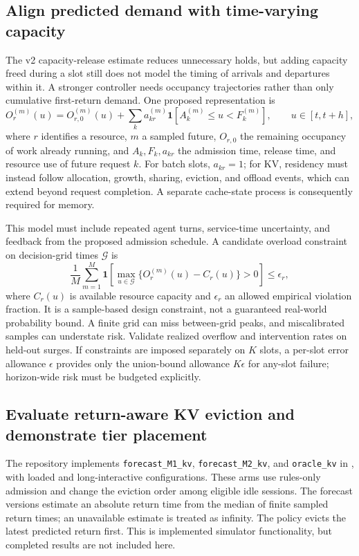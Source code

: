 \documentclass[11pt,a4paper]{article}
\begin{document}
\subsection{Align predicted demand with time-varying capacity}
The v2 capacity-release estimate reduces unnecessary holds, but adding capacity freed during a slot still does not model the timing of arrivals and departures within it. A stronger controller needs occupancy trajectories rather than only cumulative first-return demand. One proposed representation is
\begin{equation}
O_r^{(m)}(u)=O_{r,0}^{(m)}(u)+\sum_k a_{kr}^{(m)}
\mathbf{1}[A_k^{(m)}\le u<F_k^{(m)}],\qquad u\in[t,t+h],
\label{eq:future-occupancy}
\end{equation}
where \(r\) identifies a resource, \(m\) a sampled future, \(O_{r,0}\) the remaining occupancy of work already running, and \(A_k,F_k,a_{kr}\) the admission time, release time, and resource use of future request \(k\). For batch slots, \(a_{kr}=1\); for KV, residency must instead follow allocation, growth, sharing, eviction, and offload events, which can extend beyond request completion. A separate cache-state process is consequently required for memory.

This model must include repeated agent turns, service-time uncertainty, and feedback from the proposed admission schedule. A candidate overload constraint on decision-grid times \(\mathcal G\) is
\begin{equation}
\frac{1}{M}\sum_{m=1}^{M}\mathbf{1}\!\left[
\max_{u\in\mathcal G}\{O_r^{(m)}(u)-C_r(u)\}>0\right]\le\epsilon_r,
\label{eq:future-risk}
\end{equation}
where \(C_r(u)\) is available resource capacity and \(\epsilon_r\) an allowed empirical violation fraction. It is a sample-based design constraint, not a guaranteed real-world probability bound. A finite grid can miss between-grid peaks, and miscalibrated samples can understate risk. Validate realized overflow and intervention rates on held-out surges. If constraints are imposed separately on \(K\) slots, a per-slot error allowance \(\epsilon\) provides only the union-bound allowance \(K\epsilon\) for any-slot failure; horizon-wide risk must be budgeted explicitly.

\subsection{Evaluate return-aware KV eviction and demonstrate tier placement}
The repository implements \texttt{forecast\_M1\_kv}, \texttt{forecast\_M2\_kv}, and \texttt{oracle\_kv} in , with loaded and long-interactive configurations. These arms use rules-only admission and change the eviction order among eligible idle sessions. The forecast versions estimate an absolute return time from the median of finite sampled return times; an unavailable estimate is treated as infinity. The policy evicts the latest predicted return first. This is implemented simulator functionality, but completed results are not included here.
\end{document}
